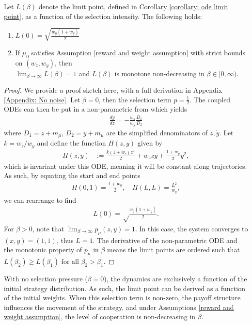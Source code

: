 \documentclass[10pt]{article}
\begin{document}
\begin{proposition}\label{prop: limit point as function of beta}
    Let $L(\beta)$ denote the limit point, defined in Corollary \ref{corollary: ode limit point}, as a function of the selection intensity. The following holds:
    \begin{enumerate}
        \item $L(0) = \sqrt{\frac{w_y(1+w_y)}{2}}$
        \item If $\mu_0$ satisfies Assumption \ref{reward and weight assumption} with strict bounds on $(w_z,w_y)$, then\\ $\lim_{\beta\rightarrow\infty}L(\beta) = 1$ and $L(\beta)$ is monotone non-decreasing in $\beta \in [0,\infty)$.
    \end{enumerate}
\end{proposition}
\begin{proof}
    We provide a proof sketch here, with a full derivation in Appendix \ref{Appendix: No noise}. Let $\beta =0$, then the selection term $p = \frac{1}{2}$. The coupled ODEs can then be put in a non-parametric from  which yields
    \begin{align*}
        \frac{dy}{dz} = -\frac{w_{z}}{w_{y}}\frac{D_1}{D_2}
    \end{align*}
    where $D_1 = z+m_\mu$, $D_2 = y+m_\mu$ are the simplified denominators of $\dot{z}, \dot{y}$. Let $k = w_z/w_y$ and define the function $H(z,y)$ given by 
    \begin{align*}
        H(z,y) &:= \frac{k(1+w_z)z^2}{2} + w_zzy + \frac{1+w_y}{2}y^2,
    \end{align*}
    which is invariant under this ODE, meaning it will be constant along trajectories. As such, by equating the start and end points
    \begin{align*}
        H(0,1) = \frac{1+w_y}{2},\quad H(L,L) = \frac{L^2}{w_y},
    \end{align*}
    we can rearrange to find 
    \begin{align*}
        L(0) = \sqrt\frac{w_y(1+w_y)}{2}.
    \end{align*}
    For $\beta>0$, note that $\lim_{\beta \rightarrow \infty} p_\mu(z,y) = 1$. In this case, the system converges to $(x,y) = (1,1)$, thus $L=1$. The derivative of the non-parametric ODE and the monotonic property of $p_\mu$ in $\beta$  means the limit points are ordered such that $L(\beta_2) \geq L(\beta_1)$ for all $\beta_2>\beta_1$.
\end{proof}
With no selection pressure ($\beta = 0$), the dynamics are exclusively a function of the initial strategy distribution. As such, the limit point can be derived as a function of the initial weights. When this selection term is non-zero, the payoff structure influences the movement of the strategy, and under Assumptions \ref{reward and weight assumption}, the level of cooperation is non-decreasing in $\beta$.
\end{document}
